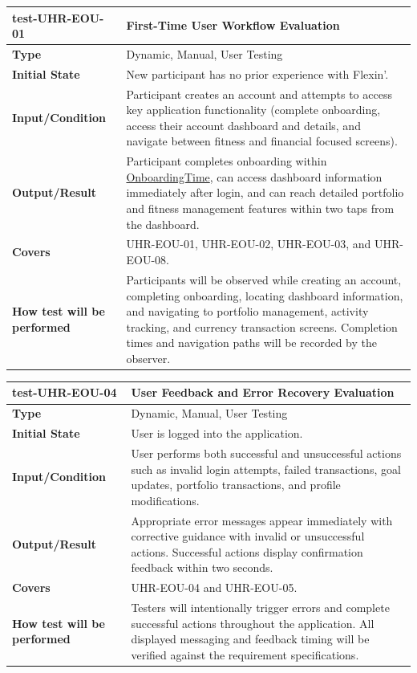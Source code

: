 \documentclass[12pt, titlepage]{article}
\newcommand{\const}[1]{\hyperlink{const:#1}{\textsf{#1}}}
\begin{document}
\noindent\begin{tabularx}{\textwidth}{>{\raggedright\arraybackslash}p{3.5cm}X}
  \toprule
  \textbf{test-UHR-EOU-01} & \textbf{First-Time User Workflow Evaluation}\\
  \midrule
  \textbf{Type} & Dynamic, Manual, User Testing\\
  \textbf{Initial State} & New participant has no prior experience with Flexin'.\\
  \textbf{Input/Condition} & Participant creates an account and attempts to access key application functionality (complete onboarding, access their account dashboard and details, and navigate between fitness and financial focused screens).\\
  \textbf{Output/Result} & Participant completes onboarding within \const{OnboardingTime}, can access dashboard information immediately after login, and can reach detailed portfolio and fitness management features within two taps from the dashboard.\\
  \textbf{Covers} & UHR-EOU-01, UHR-EOU-02, UHR-EOU-03, and UHR-EOU-08.\\
  \textbf{How test will be performed} & Participants will be observed while creating an account, completing onboarding, locating dashboard information, and navigating to portfolio management, activity tracking, and currency transaction screens. Completion times and navigation paths will be recorded by the observer.\\
  \bottomrule
\end{tabularx}

\vspace{1em}

\noindent\begin{tabularx}{\textwidth}{>{\raggedright\arraybackslash}p{3.5cm}X}
  \toprule
  \textbf{test-UHR-EOU-04} & \textbf{User Feedback and Error Recovery Evaluation}\\
  \midrule
  \textbf{Type} & Dynamic, Manual, User Testing\\
  \textbf{Initial State} & User is logged into the application.\\
  \textbf{Input/Condition} & User performs both successful and unsuccessful actions such as invalid login attempts, failed transactions, goal updates, portfolio transactions, and profile modifications.\\
  \textbf{Output/Result} & Appropriate error messages appear immediately with corrective guidance with invalid or unsuccessful actions. Successful actions display confirmation feedback within two seconds.\\
  \textbf{Covers} & UHR-EOU-04 and UHR-EOU-05.\\
  \textbf{How test will be performed} & Testers will intentionally trigger errors and complete successful actions throughout the application. All displayed messaging and feedback timing will be verified against the requirement specifications.\\
  \bottomrule
\end{tabularx}
\end{document}
